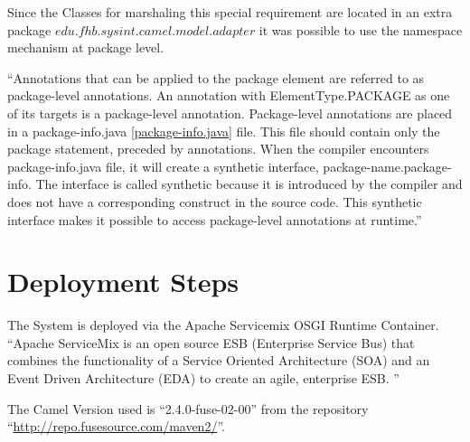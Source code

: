 \documentclass[11pt,english,ngerman, headsepline]{scrreprt}
\begin{document}


Since the Classes for marshaling this special requirement are located in an
extra package $edu.fhb.sysint.camel.model.adapter$ it was possible to use the
namespace mechanism at package level. 


``Annotations that can be applied to the
package element are referred to as package-level annotations. An annotation with
ElementType.PACKAGE as one of its targets is a package-level annotation.
Package-level annotations are placed in a package-info.java
\ref{package-info.java} file. This file should contain only the package statement, preceded by annotations. When the
compiler encounters package-info.java file, it will create a synthetic
interface, package-name.package-info. The interface is called synthetic because
it is introduced by the compiler and does not have a corresponding construct in
the source code. This synthetic interface makes it possible to access
package-level annotations at runtime.\cite{packageinfo}''






\chapter{Deployment Steps}
The System is deployed via the Apache Servicemix OSGI Runtime Container.
``Apache ServiceMix is an open source ESB (Enterprise Service Bus) that combines
 the functionality of a Service Oriented Architecture (SOA) and an Event Driven
 Architecture (EDA)  to create an agile, enterprise ESB.\cite{sm} ''
 
The Camel Version used is ``2.4.0-fuse-02-00'' from the repository
``\url{http://repo.fusesource.com/maven2/}''.
\end{document}
